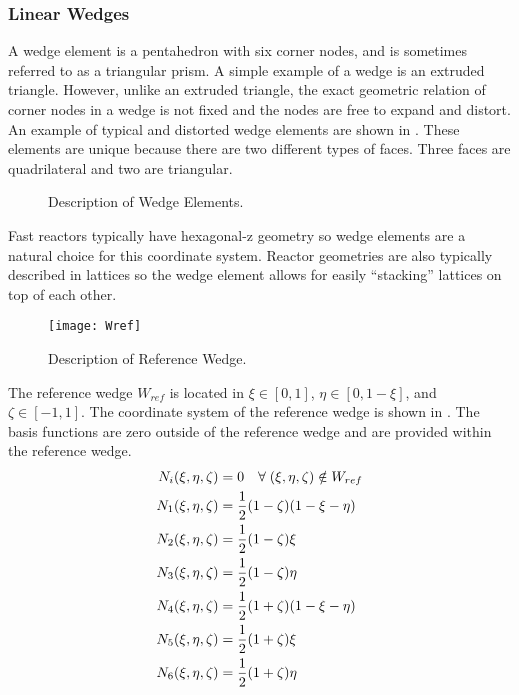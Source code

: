     \subsubsection{Linear Wedges}
      A wedge element is a pentahedron with six corner nodes, and is sometimes
      referred to as a triangular prism. A simple example of a wedge is an
      extruded triangle. However, unlike an extruded triangle, the exact 
      geometric relation of corner nodes in a wedge is not fixed and the nodes 
      are free to expand and distort. An example of typical and distorted
      wedge elements are shown in . These elements are
      unique because there are two different types of faces. Three faces are
      quadrilateral and two are triangular. 

      \begin{figure}
        \centering
        \vspace{0.5in}
        \caption{Description of Wedge Elements.}
        \label{fig:sketch_wedge}
      \end{figure}

      Fast reactors typically have hexagonal-z geometry so wedge elements are a 
      natural choice for this coordinate system. Reactor geometries are also 
      typically described in lattices so the wedge element allows for easily 
      ``stacking'' lattices on top of each other.

      \begin{figure}
        \centering
        \texttt{[image: Wref]}
        \caption{Description of Reference Wedge.}
        \label{fig:Wref}
      \end{figure}

      The reference wedge $W_{ref}$ is located in 
      $\xi \in [0,1]$, $\eta \in [0,1-\xi]$, and $\zeta \in [-1,1]$. The
      coordinate system of the reference wedge is shown in . The
      basis functions are zero outside of the reference wedge and are 
      provided within the reference wedge.
      \begin{align}
        N_i(\xi,\eta,\zeta) &= 0 \quad \forall \; (\xi,\eta,\zeta)
          \notin W_{ref} \\
        N_1(\xi,\eta,\zeta) &= \frac{1}{2} (1-\zeta)(1-\xi-\eta) \\
        N_2(\xi,\eta,\zeta) &= \frac{1}{2} (1-\zeta)\xi \\
        N_3(\xi,\eta,\zeta) &= \frac{1}{2} (1-\zeta)\eta \\
        N_4(\xi,\eta,\zeta) &= \frac{1}{2} (1+\zeta)(1-\xi-\eta) \\
        N_5(\xi,\eta,\zeta) &= \frac{1}{2} (1+\zeta)\xi \\
        N_6(\xi,\eta,\zeta) &= \frac{1}{2} (1+\zeta)\eta 
      \end{align}

